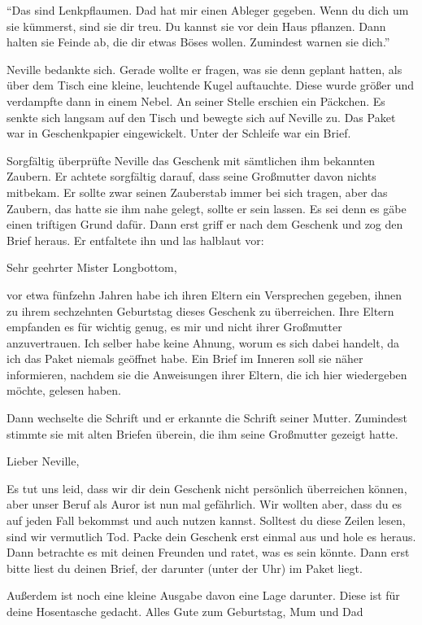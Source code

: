 \enquote{Das sind Lenkpflaumen. Dad hat mir einen Ableger gegeben. Wenn du dich um sie kümmerst, sind sie dir treu. Du kannst sie vor dein Haus pflanzen. Dann halten sie Feinde ab, die dir etwas Böses wollen. Zumindest warnen sie dich.}

Neville bedankte sich. Gerade wollte er fragen, was sie denn geplant hatten, als über dem Tisch eine kleine, leuchtende Kugel auftauchte. Diese wurde größer und verdampfte dann in einem Nebel. An seiner Stelle erschien ein Päckchen. Es senkte sich langsam auf den Tisch und bewegte sich auf Neville zu. Das Paket war in Geschenkpapier eingewickelt. Unter der Schleife war ein Brief.

Sorgfältig überprüfte Neville das Geschenk mit sämtlichen ihm bekannten Zaubern. Er achtete sorgfältig darauf, dass seine Großmutter davon nichts mitbekam. Er sollte zwar seinen Zauberstab immer bei sich tragen, aber das Zaubern, das hatte sie ihm nahe gelegt, sollte er sein lassen. Es sei denn es gäbe einen triftigen Grund dafür. Dann erst griff er nach dem Geschenk und zog den Brief heraus. Er entfaltete ihn und las halblaut vor:

\begin{brief}
Sehr geehrter Mister Longbottom,

vor etwa fünfzehn Jahren habe ich ihren Eltern ein Versprechen gegeben, ihnen zu ihrem sechzehnten Geburtstag dieses Geschenk zu überreichen. Ihre Eltern empfanden es für wichtig genug, es mir und nicht ihrer Großmutter anzuvertrauen. Ich selber habe keine Ahnung, worum es sich dabei handelt, da ich das Paket niemals geöffnet habe. Ein Brief im Inneren soll sie näher informieren, nachdem sie die Anweisungen ihrer Eltern, die ich hier wiedergeben möchte, gelesen haben.
\end{brief}

Dann wechselte die Schrift und er erkannte die Schrift seiner Mutter. Zumindest stimmte sie mit alten Briefen überein, die ihm seine Großmutter gezeigt hatte. 

\begin{brief}
Lieber Neville,

Es tut uns leid, dass wir dir dein Geschenk nicht persönlich überreichen können, aber unser Beruf als Auror ist nun mal gefährlich. Wir wollten aber, dass du es auf jeden Fall bekommst und auch nutzen kannst. Solltest du diese Zeilen lesen, sind wir vermutlich Tod. Packe dein Geschenk erst einmal aus und hole es heraus. Dann betrachte es mit deinen Freunden und ratet, was es sein könnte. Dann erst bitte liest du deinen Brief, der darunter (unter der Uhr) im Paket liegt.

Außerdem ist noch eine kleine Ausgabe davon eine Lage darunter. Diese ist für deine Hosentasche gedacht.
Alles Gute zum Geburtstag,
\signumspace
Mum und Dad
\end{brief}

